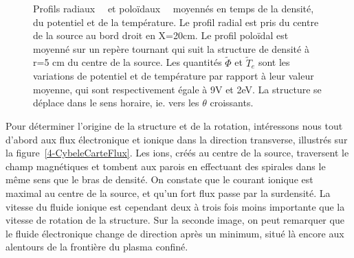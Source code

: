 \begin{refsection}
\begin{figure}[!htbp]
  \centering
    \caption{Profils radiaux~~ et
    poloïdaux~~ moyennés en temps de la densité, du
    potentiel et de la température. Le profil radial est pris du centre de la source au bord droit
    en X=20cm. Le profil poloïdal est moyenné sur un repère tournant qui suit
    la structure de densité à r=5 cm du centre de la source. Les quantités
    $\tilde{\Phi}$ et $\tilde{T}_e$ sont les variations de potentiel et de température par rapport à leur valeur
    moyenne, qui sont respectivement égale à 9V et 2eV. La structure se déplace
    dans le sens horaire, ie. vers les $\theta$ croissants.}
    \label{4-CybeleProfils}
\end{figure}

Pour déterminer l'origine de la structure et de la rotation, intéressons nous
tout d'abord aux flux électronique et ionique dans la direction
transverse, illustrés sur la figure~\ref{4-CybeleCarteFlux}.
Les ions, créés au centre de la source, traversent le champ magnétiques et
tombent aux parois en effectuant des spirales dans le même sens que le bras de
densité. On constate que le courant ionique est maximal au centre de la source,
et qu'un fort flux passe par la surdensité. La vitesse du fluide ionique
est cependant deux à trois fois moins importante que la vitesse de rotation de
la structure. Sur la seconde image, on peut remarquer que le fluide électronique
change de direction après un minimum, situé là encore aux alentours de la
frontière du plasma confiné.


\end{refsection}
